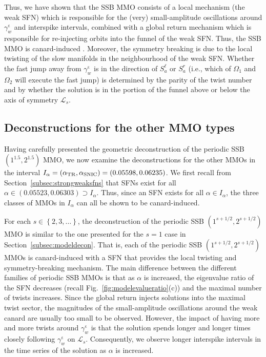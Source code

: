\documentclass[10pt,onecolumn]{article}
\newcommand{\RED}[1]{{\color{red}{#1}}}
\theoremstyle{plain}
\DeclareMathOperator{\eps}{\varepsilon}
\begin{document}
Thus, we have shown that the SSB MMO consists of a local mechanism (the weak SFN) which is responsible for the (very) small-amplitude oscillations around $\gamma_w^{\eps}$ and interspike intervals, combined with a global return mechanism which is responsible for re-injecting orbits into the funnel of the weak SFN. 
Thus, the SSB MMO is canard-induced \cite{Brons2006}.
Moreover, the symmetry breaking is due to the local twisting of the slow manifolds in the neighbourhood of the weak SFN. 
Whether the fast jump away from $\gamma_w^{\eps}$ is in the direction of $S_a^{\ell}$ or $S_a^r$ (i.e., which of $\Omega_1$ and $\Omega_2$ will execute the fast jump) is determined by the parity of the twist number and by whether the solution is in the portion of the funnel above or below the axis of symmetry $\mathcal L_s$.

\subsection{Deconstructions for the other MMO types}\label{subsec:modelMMOdecons}
Having carefully presented the geometric deconstruction of the periodic SSB $(1^{1.5},2^{1.5})$ MMO, we now examine the deconstructions for the other MMOs in the interval $I_{\alpha} = (\alpha_{\rm TR}, \alpha_{\rm SNIC}) = (0.05598,0.06235)$. 
We first recall from Section~\ref{subsec:strongweaksfns} that SFNs exist for all $\alpha \in (0.05523,0.06303) \supset I_{\alpha}$.
Thus, since an SFN exists for all $\alpha \in I_{\alpha}$, the three classes of MMOs in $I_{\alpha}$ can all be shown to be canard-induced. 

For each $s \in \left\{ 2,3,\ldots \right\}$, the deconstruction of the periodic SSB $(1^{s+1/2},2^{s+1/2})$ MMO is similar to the one presented for the $s=1$ case in Section~\ref{subsec:modeldecon}. 
That is, each of the periodic SSB $(1^{s+1/2},2^{s+1/2})$ MMOs is canard-induced with a SFN that provides the local twisting and symmetry-breaking mechanism. 
The main difference between the different families of periodic SSB MMOs is that as $\alpha$ is increased, the eigenvalue ratio of the SFN decreases (recall Fig.~\ref{fig:modelevalueratio}(c)) and the maximal number of twists increases. 
Since the global return injects solutions into the maximal twist sector, the magnitudes of the small-amplitude oscillations around the weak canard are usually too small to be observed. 
However, the impact of having more and more twists around $\gamma_w^{\eps}$ is that the solution spends longer and longer times closely following $\gamma_w^{\eps}$ on $\mathcal L_s$. 
Consequently, we observe longer interspike intervals in the time series of the solution as $\alpha$ is increased. 
%
\end{document}
